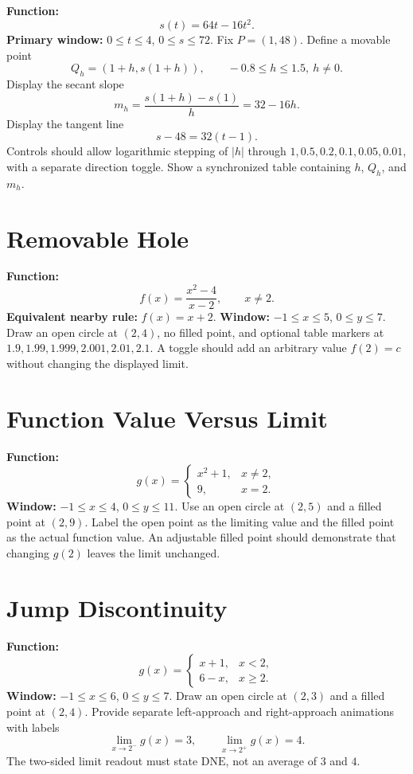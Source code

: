 \documentclass[11pt,openany]{book}
\theoremstyle{bgplain}
\newcommand{\DNE}{\mathrm{DNE}}
\begin{document}
\begin{bggraphspec}
\textbf{Function:}
\[
  s(t)=64t-16t^2.
\]
\textbf{Primary window:} \(0\le t\le4\), \(0\le s\le72\). Fix \(P=(1,48)\). Define a movable point
\[
  Q_h=(1+h,s(1+h)),\qquad -0.8\le h\le1.5,\ h\ne0.
\]
Display the secant slope
\[
  m_h=\frac{s(1+h)-s(1)}h=32-16h.
\]
Display the tangent line
\[
  s-48=32(t-1).
\]
Controls should allow logarithmic stepping of \(|h|\) through \(1,0.5,0.2,0.1,0.05,0.01\), with a separate direction toggle. Show a synchronized table containing \(h\), \(Q_h\), and \(m_h\).
\end{bggraphspec}

\section{Removable Hole}

\begin{bggraphspec}
\textbf{Function:}
\[
  f(x)=\frac{x^2-4}{x-2},\qquad x\ne2.
\]
\textbf{Equivalent nearby rule:} \(f(x)=x+2\). \textbf{Window:} \(-1\le x\le5\), \(0\le y\le7\). Draw an open circle at \((2,4)\), no filled point, and optional table markers at \(1.9,1.99,1.999,2.001,2.01,2.1\). A toggle should add an arbitrary value \(f(2)=c\) without changing the displayed limit.
\end{bggraphspec}

\section{Function Value Versus Limit}

\begin{bggraphspec}
\textbf{Function:}
\[
  g(x)=\begin{cases}x^2+1,&x\ne2,\\9,&x=2.\end{cases}
\]
\textbf{Window:} \(-1\le x\le4\), \(0\le y\le11\). Use an open circle at \((2,5)\) and a filled point at \((2,9)\). Label the open point as the limiting value and the filled point as the actual function value. An adjustable filled point should demonstrate that changing \(g(2)\) leaves the limit unchanged.
\end{bggraphspec}

\section{Jump Discontinuity}

\begin{bggraphspec}
\textbf{Function:}
\[
  g(x)=\begin{cases}x+1,&x<2,\\6-x,&x\ge2.\end{cases}
\]
\textbf{Window:} \(-1\le x\le6\), \(0\le y\le7\). Draw an open circle at \((2,3)\) and a filled point at \((2,4)\). Provide separate left-approach and right-approach animations with labels
\[
  \lim_{x\to2^-}g(x)=3,
  \qquad
  \lim_{x\to2^+}g(x)=4.
\]
The two-sided limit readout must state \(\DNE\), not an average of \(3\) and \(4\).
\end{bggraphspec}
\end{document}
